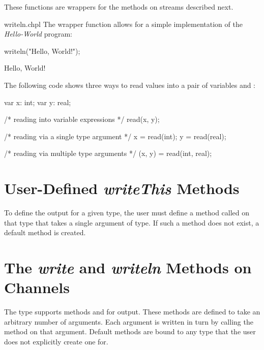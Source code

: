These functions are wrappers for the methods on streams described next.

\begin{chapelexample}{writeln.chpl}
The  wrapper function allows for a simple implementation
of the {\em Hello-World} program:
\begin{chapel}
writeln("Hello, World!");
\end{chapel}
\begin{chapelprintoutput}
Hello, World!
\end{chapelprintoutput}
\end{chapelexample}

\begin{example}
The following code shows three ways to read values into a pair of
variables  and :
\begin{chapel}
var x: int;
var y: real;

/* reading into variable expressions */
read(x, y);

/* reading via a single type argument */
x = read(int);
y = read(real);

/* reading via multiple type arguments */
(x, y) = read(int, real);
\end{chapel}
\end{example}

\section{User-Defined {\em writeThis} Methods}

To define the output for a given type, the user must define a method
called  on that type that takes a single argument of
 type.  If such a method does not exist, a default method is
created.

\section{The {\em write} and {\em writeln} Methods on Channels}
\label{IO_channel_write}

The  type supports methods  and 
for output.  These methods are defined to take an arbitrary number of
arguments.  Each argument is written in turn by calling
the  method on that argument.
Default  methods are bound to any type that the user
does not explicitly create one for.

